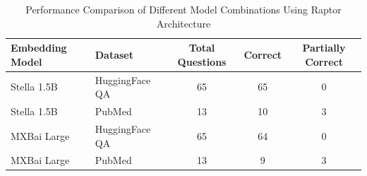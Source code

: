 \documentclass{scrartcl}
\begin{document}
\begin{table}[H]
    \centering
    \caption{Performance Comparison of Different Model Combinations Using Raptor Architecture}
    \begin{tabular}{llccc}
    \hline
    Embedding Model & Dataset & Total Questions & Correct & Partially Correct \\
    \hline
    Stella 1.5B & HuggingFace QA & 65 & 65 & 0 \\
    Stella 1.5B & PubMed & 13 & 10 & 3 \\
    MXBai Large & HuggingFace QA & 65 & 64 & 0 \\
    MXBai Large & PubMed & 13 & 9 & 3 \\
    \hline
    \end{tabular}
    \label{tab:model_performance}
\end{table}
\end{document}
